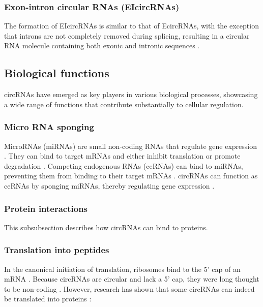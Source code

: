 \subsubsection{Exon-intron circular RNAs (EIcircRNAs)}
The formation of EIcircRNAs is similar to that of EcircRNAs, with the exception
that introns are not completely removed during splicing, resulting in a circular
RNA molecule containing both exonic and intronic sequences
\supercite{xiao_circular_2022}.

\subsection{Biological functions}
circRNAs have emerged as key players in various biological processes, showcasing
a wide range of functions that contribute substantially to cellular regulation.

\subsubsection{Micro RNA sponging}
MicroRNAs (miRNAs) are small non-coding RNAs that regulate gene expression
\supercite{bartel_micrornas_2009}. They can bind to target mRNAs and either
inhibit translation or promote degradation \supercite{bartel_micrornas_2009}.
Competing endogenous RNAs (ceRNAs) can bind to miRNAs, preventing them from
binding to their target mRNAs \supercite{tay_multilayered_2014}. circRNAs can
function as ceRNAs by sponging miRNAs, thereby regulating gene expression
\supercite{xiao_circular_2022}.

\subsubsection{Protein interactions}
This subsubsection describes how circRNAs can bind to proteins.

\subsubsection{Translation into peptides}
In the canonical initiation of translation, ribosomes bind to the 5' cap of an
mRNA \supercite{hinnebusch_mechanism_2012}. Because circRNAs are circular and
lack a 5' cap, they were long thought to be non-coding
\supercite{bao_regulatory_2019,greene_circular_2017}. However, research has
shown that some circRNAs can indeed be translated into proteins
\supercite{chen_expanding_2020}:

